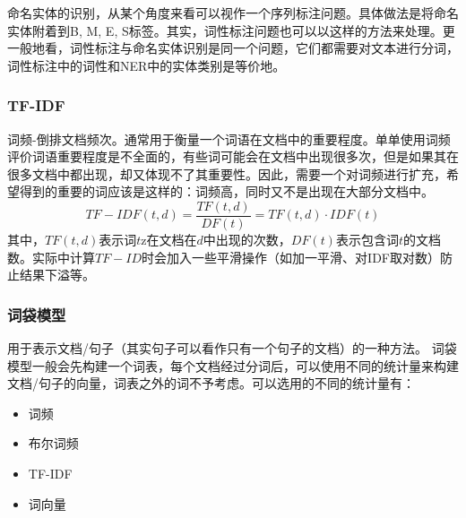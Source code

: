 命名实体的识别，从某个角度来看可以视作一个序列标注问题。具体做法是将命名实体附着到{B, M, E, S}标签。其实，词性标注问题也可以以这样的方法来处理。更一般地看，词性标注与命名实体识别是同一个问题，它们都需要对文本进行分词，词性标注中的词性和NER中的实体类别是等价地。

\subsubsection{TF-IDF}
词频-倒排文档频次。通常用于衡量一个词语在文档中的重要程度。单单使用词频评价词语重要程度是不全面的，有些词可能会在文档中出现很多次，但是如果其在很多文档中都出现，却又体现不了其重要性。因此，需要一个对词频进行扩充，希望得到的重要的词应该是这样的：词频高，同时又不是出现在大部分文档中。
$$
TF-IDF(t, d) = \frac{TF(t, d)}{DF(t)} = TF(t, d) \cdot IDF(t)
$$
其中，$TF(t, d)$表示词$t$z在文档在$d$中出现的次数，$DF(t)$表示包含词$t$的文档数。实际中计算$TF-ID$时会加入一些平滑操作（如加一平滑、对IDF取对数）防止结果下溢等。 

\subsubsection{词袋模型}
用于表示文档/句子（其实句子可以看作只有一个句子的文档）的一种方法。
词袋模型一般会先构建一个词表，每个文档经过分词后，可以使用不同的统计量来构建文档/句子的向量，词表之外的词不予考虑。可以选用的不同的统计量有：
\begin{itemize}
	\item 词频
	\item 布尔词频
	\item TF-IDF
	\item 词向量
\end{itemize}

